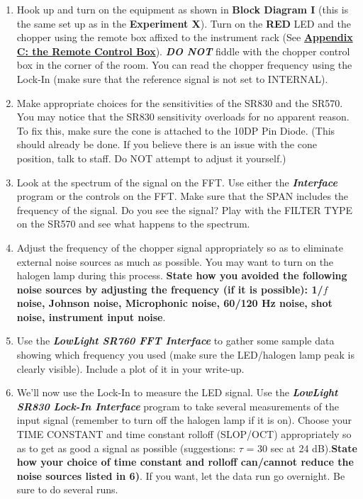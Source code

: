 \documentclass{../lab}
\begin{document}
\begin{enumerate}
    \item Hook up and turn on the equipment as shown in \textbf{Block Diagram I} (this is the same set up as in the \textbf{Experiment X}). Turn on the \textbf{RED} LED and the chopper using the remote box affixed to the instrument rack (See \href{https://berkeley-physics111b.github.io/appendices/LLS-Appendix-C-the-Remote-Control-Box/}{\textbf{Appendix C: the Remote Control Box}}). \emph{\textbf{DO NOT}} fiddle with the chopper control box in the corner of the room. You can read the chopper frequency using the Lock-In (make sure that the reference signal is not set to INTERNAL).

    \item Make appropriate choices for the sensitivities of the SR830 and the SR570. You may notice that the SR830 sensitivity overloads for no apparent reason. To fix this, make sure the cone is attached to the 10DP Pin Diode. (This should already be done. If you believe there is an issue with the cone position, talk to staff. Do NOT attempt to adjust it yourself.)


    \item Look at the spectrum of the signal on the FFT. Use either the \emph{\textbf{Interface}} program or the controls on the FFT. Make sure that the SPAN includes the frequency of the signal. Do you see the signal? Play with the FILTER TYPE on the SR570 and see what happens to the spectrum.

    \item Adjust the frequency of the chopper signal appropriately so as to eliminate external noise sources as much as possible. You may want to turn on the halogen lamp during this process. \textbf{State how you avoided the following noise sources by adjusting the frequency (if it is possible): 1/$f$ noise, Johnson noise, Microphonic noise, 60/120 Hz noise, shot noise, instrument input noise}.

    \item Use the \emph{\textbf{LowLight SR760 FFT Interface}} to gather some sample data showing which frequency you used (make sure the LED/halogen lamp peak is clearly visible). Include a plot of it in your write-up.

    \item We'll now use the Lock-In to measure the LED signal. Use the \emph{\textbf{LowLight SR830 Lock-In Interface}} program to take several measurements of the input signal (remember to turn off the halogen lamp if it is on). Choose your TIME CONSTANT and time constant rolloff (SLOP/OCT) appropriately so as to get as good a signal as possible (suggestions: $\tau$ = 30 sec at 24 dB).\textbf{State how your choice of time constant and rolloff can/cannot reduce the noise sources listed in 6)}. If you want, let the data run go overnight. Be sure to do several runs.


\end{enumerate}
\end{document}
